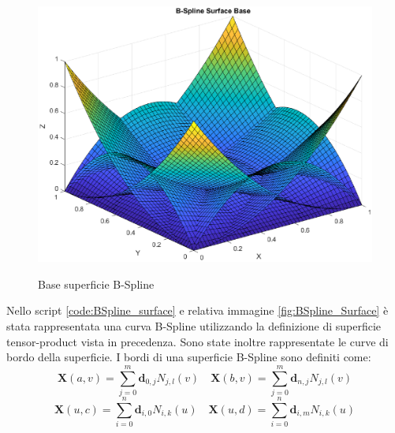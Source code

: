 \documentclass[a4paper, 12pt]{article}
\begin{document}

\begin{figure}[h!]
	\centering
	\caption{Base superficie B-Spline}
	\includegraphics[scale=0.7]{surface_base_plot.eps}
	\label{fig:BSplineBaseSurface}
\end{figure}
Nello script \ref{code:BSpline_surface} e relativa immagine \ref{fig:BSpline_Surface} è stata rappresentata una curva B-Spline utilizzando la definizione di superficie tensor-product vista in precedenza. Sono state inoltre rappresentate le curve di bordo della superficie. I bordi di una superficie B-Spline sono definiti come:
$$\mathbf{X}(a,v) = \sum_{j=0}^{m} \mathbf{d}_{0,j}N_{j, l}(v) \quad \mathbf{X}(b,v) = \sum_{j=0}^{m} \mathbf{d}_{n,j}N_{j,l}(v)$$
$$\mathbf{X}(u, c) = \sum_{i=0}^{n} \mathbf{d}_{i,0}N_{i,k}(u) \quad \mathbf{X}(u,d) = \sum_{i=0}^{n} \mathbf{d}_{i, m}N_{i,k}(u)$$


\end{document}
